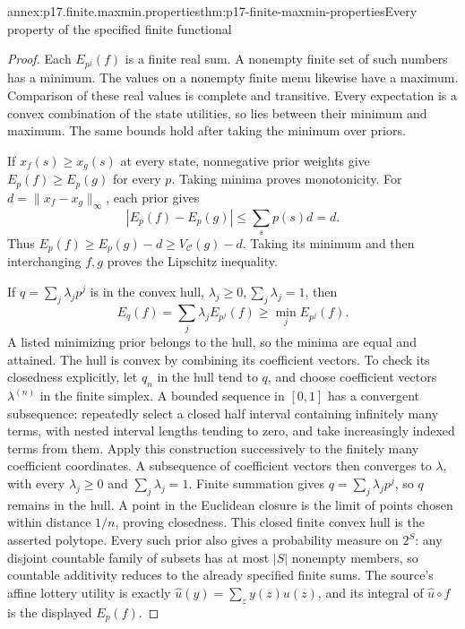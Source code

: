 \begin{annexitem}{annex:p17.finite.maxmin.properties}{thm:p17-finite-maxmin-properties}{Every property of the specified finite functional}
\begin{proof}
Each \(E_{p^j}(f)\) is a finite real sum.
A nonempty finite set of such numbers has a
minimum. The values on a nonempty finite menu
likewise have a maximum. Comparison of these
real values is complete and transitive.
Every expectation is a convex combination of
the state utilities, so lies between their
minimum and maximum. The same bounds hold
after taking the minimum over priors.

If \(x_f(s)\geq x_g(s)\) at every state,
nonnegative prior weights give
\(E_p(f)\geq E_p(g)\) for every \(p\).
Taking minima proves monotonicity.
For \(d=\|x_f-x_g\|_\infty\), each prior gives
\[
             |E_p(f)-E_p(g)|
                     \leq\sum_sp(s)d=d.
\]
Thus \(E_p(f)\geq E_p(g)-d\geq V_{\mathcal C}(g)-d\).
Taking its minimum and then interchanging \(f,g\)
proves the Lipschitz inequality.

If \(q=\sum_j\lambda_jp^j\) is in the convex hull,
\(\lambda_j\geq0,\sum_j\lambda_j=1\), then
\[
               E_q(f)=\sum_j\lambda_jE_{p^j}(f)
                                      \geq\min_j E_{p^j}(f).
\]
A listed minimizing prior belongs to the hull,
so the minima are equal and attained.
The hull is convex by combining its coefficient
vectors. To check its closedness explicitly,
let \(q_n\) in the hull tend to \(q\), and
choose coefficient vectors \(\lambda^{(n)}\)
in the finite simplex. A bounded sequence in
\([0,1]\) has a convergent subsequence: repeatedly
select a closed half interval containing infinitely
many terms, with nested interval lengths tending
to zero, and take increasingly indexed terms
from them. Apply this construction successively
to the finitely many coefficient coordinates.
A subsequence of coefficient vectors then
converges to \(\lambda\), with every
\(\lambda_j\geq0\) and \(\sum_j\lambda_j=1\).
Finite summation gives \(q=\sum_j\lambda_jp^j\),
so \(q\) remains in the hull. A point in the
Euclidean closure is the limit of points chosen
within distance \(1/n\), proving closedness.
This closed finite convex hull is the asserted
polytope.
Every such prior also gives a probability measure on \(2^S\):
any disjoint countable family of subsets has at most
\(|S|\) nonempty members, so countable additivity reduces
to the already specified finite sums.
The source's affine lottery utility is exactly
\(\widehat u(y)=\sum_z y(z)u(z)\), and its integral of
\(\widehat u\circ f\) is the displayed \(E_p(f)\).


\end{proof}
\end{annexitem}
